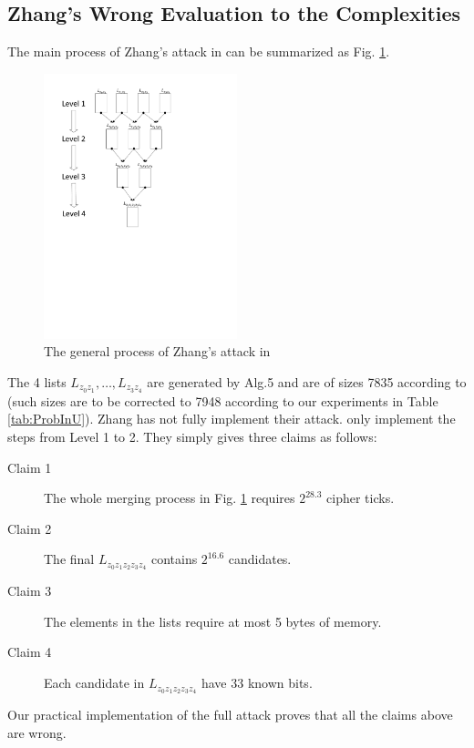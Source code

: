 \subsection{Zhang's Wrong Evaluation to the Complexities}\label{sec:ZhangWrongCompAnalysis}
The main process of Zhang's attack in \cite{AC:Zhang19} can be summarized as Fig. \ref{fig:MergeZhang}.
\begin{figure}[htbp]
  \centering
  \includegraphics[width=0.5\textwidth]{pic/MergeZhang.pdf}
  \caption{The general process of Zhang's attack in \cite{AC:Zhang19}}\label{fig:MergeZhang}
\end{figure}
The 4 lists $L_{z_0z_1},\ldots, L_{z_3z_4}$ are generated by Alg.5 and are of sizes 7835 according to \cite{AC:Zhang19} (such sizes are to be corrected to 7948 according to our experiments in Table \ref{tab:ProbInU}).
Zhang has not fully implement their attack.
\cite{AC:Zhang19} only implement the steps from Level 1 to 2.
They simply gives three claims as follows:
\begin{description}
  \item[Claim 1] The whole merging process in Fig. \ref{fig:MergeZhang} requires $2^{28.3}$ cipher ticks.
  \item[Claim 2] The final $L_{z_0z_1z_2z_3z_4}$ contains $2^{16.6}$ candidates.
  \item[Claim 3] The elements in the lists require at most 5 bytes of memory.
  \item[Claim 4] Each candidate in $L_{z_0z_1z_2z_3z_4}$ have 33 known bits.
\end{description}
Our practical implementation of the full attack proves that all the claims above are wrong.

